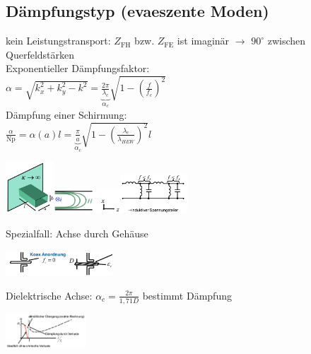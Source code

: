 \documentclass[english]{latex4ei/latex4ei_sheet}
\begin{document}
\begin{sectionbox}
    \subsection{Dämpfungstyp (evaeszente Moden)}
    kein Leistungstransport: $Z_{\text{FH}}$ bzw. $Z_{\text{FE}}$ ist imaginär $\rightarrow$ $90^\circ$ zwischen Querfeldstärken\\
    Exponentieller Dämpfungsfaktor:\\
    $\alpha=\sqrt{k_{x}^{2}+k_{y}^{2}-k^{2}}=\underbrace{\frac{2 \pi}{\lambda_{c}}}_{\alpha_{c}} \sqrt{1-\left(\frac{f}{f_{c}}\right)^{2}}$\\
    Dämpfung einer Schirmung:\\
    $\frac{\alpha}{\mathrm{Np}}=\alpha(a) l=\underbrace{\frac{\pi}{a}}_{\alpha_c} \sqrt{1-\left(\frac{\lambda_{c}}{\lambda_{H E W}}\right)^{2}} l$\\
    \begin{center}\includegraphics[width = 1.8cm]{./img/hl-schirmung.png}\includegraphics[width = 2.5cm]{./img/hl-schirmung3.png}\includegraphics[width = 2.5cm]{./img/hl-daempfung.png}\end{center}
    Spezialfall: Achse durch Gehäuse\\
    \begin{center}\includegraphics[width = 4cm]{./img/hl-schirmung2.jpeg}\end{center}
    Dielektrische Achse: $\alpha_{c}=\frac{2 \pi}{1,71 D}$ bestimmt Dämpfung\\
    \begin{center}\includegraphics[width = 3cm]{./img/hl-dampfung.png}\end{center}

\end{sectionbox}
\end{document}

